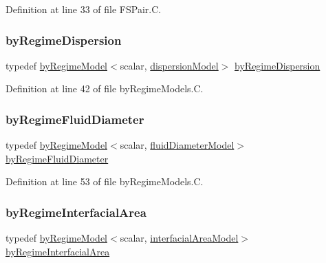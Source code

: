 Definition at line 33 of file F\+S\+Pair.\+C.

\mbox{\label{namespaceFoam_aca2583acdeaa11914afd02b147b665e0}} 
\subsubsection{\texorpdfstring{by\+Regime\+Dispersion}{byRegimeDispersion}}
{\footnotesize\ttfamily typedef \hyperlink{classFoam_1_1byRegimeModel}{by\+Regime\+Model}$<$scalar, \hyperlink{classFoam_1_1dispersionModel}{dispersion\+Model}$>$ \hyperlink{namespaceFoam_aca2583acdeaa11914afd02b147b665e0}{by\+Regime\+Dispersion}}



Definition at line 42 of file by\+Regime\+Models.\+C.

\mbox{\label{namespaceFoam_a37b69c3166b91333f06a5a6e7edcbcfe}} 
\subsubsection{\texorpdfstring{by\+Regime\+Fluid\+Diameter}{byRegimeFluidDiameter}}
{\footnotesize\ttfamily typedef \hyperlink{classFoam_1_1byRegimeModel}{by\+Regime\+Model}$<$scalar, \hyperlink{classFoam_1_1fluidDiameterModel}{fluid\+Diameter\+Model}$>$ \hyperlink{namespaceFoam_a37b69c3166b91333f06a5a6e7edcbcfe}{by\+Regime\+Fluid\+Diameter}}



Definition at line 53 of file by\+Regime\+Models.\+C.

\mbox{\label{namespaceFoam_afdf68c0599c54515d78f0565678d1545}} 
\subsubsection{\texorpdfstring{by\+Regime\+Interfacial\+Area}{byRegimeInterfacialArea}}
{\footnotesize\ttfamily typedef \hyperlink{classFoam_1_1byRegimeModel}{by\+Regime\+Model}$<$scalar, \hyperlink{classFoam_1_1interfacialAreaModel}{interfacial\+Area\+Model}$>$ \hyperlink{namespaceFoam_afdf68c0599c54515d78f0565678d1545}{by\+Regime\+Interfacial\+Area}}



